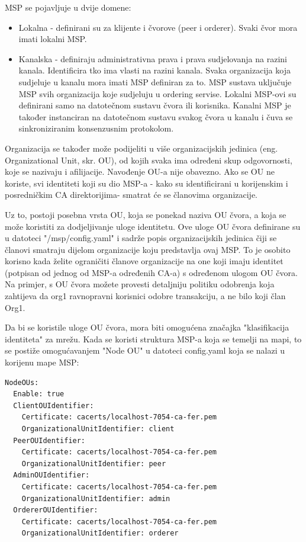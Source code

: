 \documentclass[times, utf8, diplomski]{fer}
\begin{document}
MSP se pojavljuje u dvije domene:
\begin{itemize}
\item Lokalna - definirani su za klijente i čvorove (peer i orderer). Svaki čvor mora imati lokalni MSP.
\item Kanalska - definiraju administrativna prava i prava sudjelovanja na razini kanala.  Identificira tko ima vlasti na razini kanala.  Svaka organizacija koja sudjeluje u kanalu mora imati MSP definiran za to.  MSP sustava uključuje MSP svih organizacija koje sudjeluju u ordering servise.  Lokalni MSP-ovi su definirani samo na datotečnom sustavu čvora ili korisnika.  Kanalni MSP je također instanciran na datotečnom sustavu svakog čvora u kanalu i čuva se sinkroniziranim konsenzusnim protokolom.
\end{itemize}

Organizacija se također može podijeliti u više organizacijskih jedinica (eng. Organizational Unit, skr. OU), od kojih svaka ima određeni skup odgovornosti, koje se nazivaju i afilijacije.   Navođenje OU-a nije obavezno. Ako se OU ne koriste, svi identiteti koji su dio MSP-a - kako su identificirani u korijenskim i posredničkim CA direktorijima- smatrat će se članovima organizacije.

Uz to, postoji posebna vrsta OU, koja se ponekad naziva OU čvora, a koja se može koristiti za dodjeljivanje uloge identitetu. Ove uloge OU čvora definirane su u datoteci "/msp/config.yaml" i sadrže popis organizacijskih jedinica čiji se članovi smatraju dijelom organizacije koju predstavlja ovaj MSP. To je osobito korisno kada želite ograničiti članove organizacije na one koji imaju identitet (potpisan od jednog od MSP-a određenih CA-a) s određenom ulogom OU čvora. Na primjer, s OU čvora možete provesti detaljniju politiku odobrenja koja zahtijeva da org1 ravnopravni korisnici odobre transakciju, a ne bilo koji član Org1.

Da bi se koristile uloge OU čvora, mora biti omogućena značajka "klasifikacija identiteta" za mrežu. Kada se koristi struktura MSP-a koja se temelji na mapi, to se postiže omogućavanjem "Node OU" u datoteci config.yaml koja se nalazi u korijenu mape MSP:

\begin{verbatim}
NodeOUs:
  Enable: true
  ClientOUIdentifier:
    Certificate: cacerts/localhost-7054-ca-fer.pem
    OrganizationalUnitIdentifier: client
  PeerOUIdentifier:
    Certificate: cacerts/localhost-7054-ca-fer.pem
    OrganizationalUnitIdentifier: peer
  AdminOUIdentifier:
    Certificate: cacerts/localhost-7054-ca-fer.pem
    OrganizationalUnitIdentifier: admin
  OrdererOUIdentifier:
    Certificate: cacerts/localhost-7054-ca-fer.pem
    OrganizationalUnitIdentifier: orderer

\end{verbatim}
\end{document}
